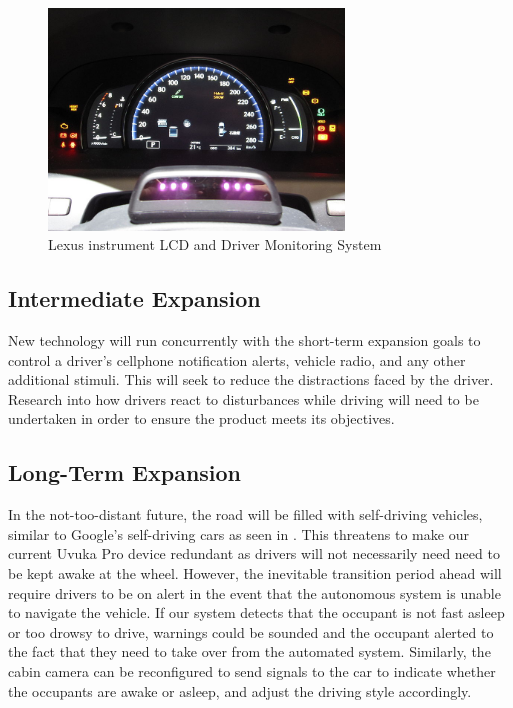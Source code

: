 \begin{figure}[H]
\centering
\includegraphics[width=0.7\textwidth]{images/lexus_monitoring}
\vskip10pt
\caption[Lexus Dashboard]{Lexus instrument LCD and Driver Monitoring System \cite{lexusdash}}
\label{fig:lexusdash}
\end{figure}

\subsection{Intermediate Expansion}
New technology will run concurrently with the short-term expansion goals to control a driver's cellphone notification alerts, vehicle radio, and any other additional stimuli. This will seek to reduce the distractions faced by the driver. Research into how drivers react to disturbances while driving will need to be undertaken in order to ensure the product meets its objectives.

\newpage
\subsection{Long-Term Expansion}
In the not-too-distant future, the road will be filled with self-driving vehicles, similar to Google's self-driving cars as seen in . This threatens to make our current Uvuka Pro device redundant as drivers will not necessarily need need to be kept awake at the wheel. However, the inevitable transition period ahead will require drivers to be on alert in the event that the autonomous system is unable to navigate the vehicle. If our system detects that the occupant is not fast asleep or too drowsy to drive, warnings could be sounded and the occupant alerted to the fact that they need to take over from the automated system. Similarly, the cabin camera can be reconfigured to send signals to the car to indicate whether the occupants are awake or asleep, and adjust the driving style accordingly.

